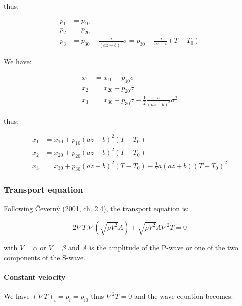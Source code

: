 \documentclass[main.tex]{subfiles}
\begin{document}
thus:

\begin{equation}
\begin{split}
p_1 & = p_{10} \\
p_2 & = p_{20} \\
p_3 & = p_{30} - \frac{a}{(a z + b)^3} \sigma = p_{30} - \frac{a}{a z + b} (T - T_0)
\end{split}
\end{equation}

We have:

\begin{equation}
\begin{split}
x_1 & = x_{10} + p_{10} \sigma \\
x_2 & = x_{20} + p_{20} \sigma \\
x_3 & = x_{30} + p_{30} \sigma - \frac{1}{2} \frac{a}{(a z + b)^3} \sigma^2
\end{split}
\end{equation}

thus:

\begin{equation}
\begin{split}
x_1 & = x_{10} + p_{10} (a z + b)^2 (T - T_0) \\
x_2 & = x_{20} + p_{20} (a z + b)^2 (T - T_0) \\
x_3 & = x_{30} + p_{30} (a z + b)^2 (T - T_0) - \frac{1}{2} a (a z + b) (T - T_0)^2
\end{split}
\end{equation}

\subsubsection{Transport equation}

Following \v Cevern\'y (2001, ch. 2.4), the transport equation is:

\begin{equation}
2 \nabla T . \nabla (\sqrt{\rho V^2} A) + \sqrt{\rho V^2} A \nabla^2 T = 0
\end{equation}

with $V = \alpha$ or $V= \beta$ and $A$ is the amplitude of the P-wave or one of the two components of the S-wave.

\paragraph{Constant velocity}

We have $(\nabla T)_i = p_i = p_{i0}$ thus $\nabla^2 T = 0$ and the wave equation becomes:
\end{document}

